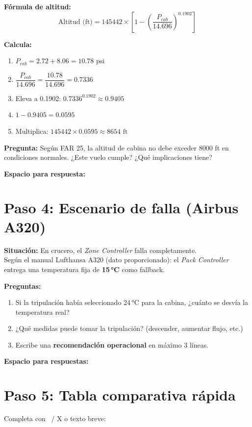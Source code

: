 \documentclass[11pt, a4paper]{article}
\begin{document}
\textbf{Fórmula de altitud:}
\[
\text{Altitud (ft)} = 145442 \times \left[ 1 - \left( \frac{P_{cab}}{14.696} \right)^{0.1902} \right]
\]

\textbf{Calcula:}
\begin{enumerate}
    \item \( P_{cab} = 2.72 + 8.06 = \boxed{10.78 \text{ psi}} \)
    \item \( \dfrac{P_{cab}}{14.696} = \dfrac{10.78}{14.696} = \boxed{0.7336} \)
    \item Eleva a 0.1902: \( 0.7336^{0.1902} \approx \boxed{0.9405} \)
    \item \( 1 - 0.9405 = \boxed{0.0595} \)
    \item Multiplica: \( 145442 \times 0.0595 \approx \boxed{8654 \text{ ft}} \)
\end{enumerate}

\textbf{Pregunta:} Según FAR 25, la altitud de cabina no debe exceder 8000 ft en condiciones normales. ¿Este vuelo cumple? ¿Qué implicaciones tiene?

\vspace{0.3cm}
\textbf{Espacio para respuesta:}
\vspace{1.5cm}

\section{Paso 4: Escenario de falla (Airbus A320)}
\textbf{Situación:} En crucero, el \textit{Zone Controller} falla completamente. \\
Según el manual Lufthansa A320 (dato proporcionado): el \textit{Pack Controller} entrega una temperatura fija de \textbf{15\,°C} como fallback.

\textbf{Preguntas:}
\begin{enumerate}
    \item Si la tripulación había seleccionado 24\,°C para la cabina, ¿cuánto se desvía la temperatura real?
    \item ¿Qué medidas puede tomar la tripulación? (descender, aumentar flujo, etc.)
    \item Escribe una \textbf{recomendación operacional} en máximo 3 líneas.
\end{enumerate}

\vspace{0.3cm}
\textbf{Espacio para respuestas:}
\vspace{3cm}

\section{Paso 5: Tabla comparativa rápida}
Completa con \checkmark\ / \textsf{X} o texto breve:
\end{document}
